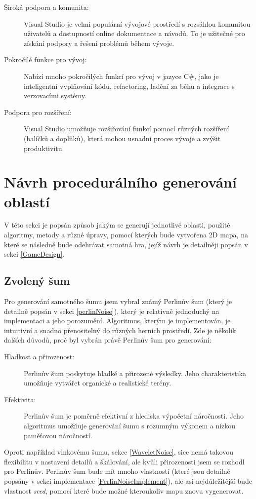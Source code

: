 \begin{description}
	\item [Široká podpora a komunita:] Visual Studio je velmi populární vývojové prostředí s rozsáhlou komunitou uživatelů a dostupností online dokumentace a návodů. To je užitečné pro získání podpory a řešení problémů během vývoje.
	\item [Pokročilé funkce pro vývoj:] Nabízí mnoho pokročilých funkcí pro vývoj v jazyce C\#, jako je inteligentní vyplňování kódu, refactoring, ladění za běhu a integrace s verzovacími systémy. 
	\item [Podpora pro rozšíření:] Visual Studio umožňuje rozšiřování funkcí pomocí různých rozšíření (balíčků a doplňků), která mohou usnadni proces vývoje a zvýšit produktivitu.
\end{description}

\section{Návrh procedurálního generování oblastí}
V této sekci je popsán způsob jakým se generují jednotlivé oblasti, použité algoritmy, metody a různé úpravy, pomocí kterých bude vytvořena 2D mapa, na které se následně bude odehrávat samotná hra, jejíž návrh je detailněji popsán v sekci \ref{GameDesign}.

\subsection{Zvolený šum}
Pro generování samotného šumu jsem vybral známý Perlinův šum (který je detailně popsán v sekci \ref{perlinNoise}), který je relativně jednoduchý na implementaci a jeho porozumění. Algoritmus, kterým je implementován, je intuitivní a snadno přenositelný do různých herních prostředí. Zde je několik dalších důvodů, proč byl vybrán právě Perlinův šum pro generování:

\begin{description}
	\item[Hladkost a přirozenost:] Perlinův šum poskytuje hladké a přirozené výsledky. Jeho charakteristika umožňuje vytvářet organické a realistické terény.
	\item[Efektivita:] Perlinův šum je poměrně efektivní z hlediska výpočetní náročnosti. Jeho algoritmus umožňuje generování šumu s rozumným výkonem a nízkou paměťovou náročností.
\end{description}

Oproti například vlnkovému šumu, sekce \ref{WaveletNoise}, sice nemá takovou flexibilitu v nastavení detailů a škálování, ale kvůli přirozenosti jsem se rozhodl pro Perlinův. Perlinův šum bude mít mnoho vlastností (které jsou detailně popsány v sekci implementace \ref{PerlinNoiseImplement}), ale asi nejdůležitější bude vlastnost \textit{seed}, pomocí které bude možné kteroukoliv mapu znovu vygenerovat.

